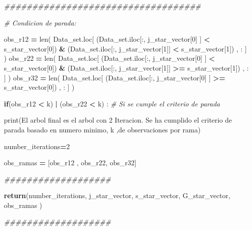 \documentclass[
  11pt,
  a4paper,
]{article}
\newenvironment{Shaded}{\begin{snugshade}}{\end{snugshade}}
\newcommand{\BuiltInTok}[1]{#1}
\newcommand{\CommentTok}[1]{\textcolor[rgb]{0.56,0.35,0.01}{\textit{#1}}}
\newcommand{\ControlFlowTok}[1]{\textcolor[rgb]{0.13,0.29,0.53}{\textbf{#1}}}
\newcommand{\DecValTok}[1]{\textcolor[rgb]{0.00,0.00,0.81}{#1}}
\newcommand{\NormalTok}[1]{#1}
\newcommand{\OperatorTok}[1]{\textcolor[rgb]{0.81,0.36,0.00}{\textbf{#1}}}
\newcommand{\StringTok}[1]{\textcolor[rgb]{0.31,0.60,0.02}{#1}}
\begin{document}
\begin{Shaded}
\begin{Highlighting}[]
      \CommentTok{\#\#\#\#\#\#\#\#\#\#\#\#\#\#\#\#\#\#\#\#\#\#\#\#\#\#\#\#\#\#\#\#\#\#\#}

        \CommentTok{\# Condicion de parada:}

\NormalTok{        obs\_r12 }\OperatorTok{=} \BuiltInTok{len}\NormalTok{( Data\_set.loc[ (Data\_set.iloc[:, j\_star\_vector[}\DecValTok{0}\NormalTok{] ] }\OperatorTok{\textless{}}\NormalTok{ s\_star\_vector[}\DecValTok{0}\NormalTok{]) }\OperatorTok{\&}\NormalTok{ (Data\_set.iloc[:, j\_star\_vector[}\DecValTok{1}\NormalTok{]] }\OperatorTok{\textless{}}\NormalTok{ s\_star\_vector[}\DecValTok{1}\NormalTok{]) , : ] )}
\NormalTok{        obs\_r22 }\OperatorTok{=} \BuiltInTok{len}\NormalTok{( Data\_set.loc[ (Data\_set.iloc[:, j\_star\_vector[}\DecValTok{0}\NormalTok{] ] }\OperatorTok{\textless{}}\NormalTok{ s\_star\_vector[}\DecValTok{0}\NormalTok{]) }\OperatorTok{\&}\NormalTok{ (Data\_set.iloc[:, j\_star\_vector[}\DecValTok{1}\NormalTok{]] }\OperatorTok{\textgreater{}=}\NormalTok{ s\_star\_vector[}\DecValTok{1}\NormalTok{]) , : ] )}
\NormalTok{        obs\_r32 }\OperatorTok{=} \BuiltInTok{len}\NormalTok{( Data\_set.loc[ (Data\_set.iloc[:, j\_star\_vector[}\DecValTok{0}\NormalTok{] ] }\OperatorTok{\textgreater{}=}\NormalTok{ s\_star\_vector[}\DecValTok{0}\NormalTok{]) , : ] )}

        \ControlFlowTok{if}\NormalTok{(obs\_r12 }\OperatorTok{\textless{}}\NormalTok{ k) }\OperatorTok{|}\NormalTok{ (obs\_r22 }\OperatorTok{\textless{}}\NormalTok{ k) : }\CommentTok{\# Si se cumple el criterio de parada}


            \BuiltInTok{print}\NormalTok{(}\StringTok{\textquotesingle{}El arbol final es el arbol con 2 Iteracion. Se ha cumplido el criterio de parada basado en numero minimo\textquotesingle{}}\NormalTok{, k ,}\StringTok{\textquotesingle{}de observaciones por rama\textquotesingle{}}\NormalTok{)}

\NormalTok{            number\_iterations}\OperatorTok{=}\DecValTok{2}
            
\NormalTok{            obs\_ramas }\OperatorTok{=}\NormalTok{ [obs\_r12 , obs\_r22, obs\_r32]}

        
            \CommentTok{\#\#\#\#\#\#\#\#\#\#\#\#\#\#\#\#\#\#\#}
            
            \ControlFlowTok{return}\NormalTok{(number\_iterations, j\_star\_vector, s\_star\_vector, G\_star\_vector, obs\_ramas ) }

            \CommentTok{\#\#\#\#\#\#\#\#\#\#\#\#\#\#\#\#\#\#\#}



\end{Highlighting}
\end{Shaded}
\end{document}
